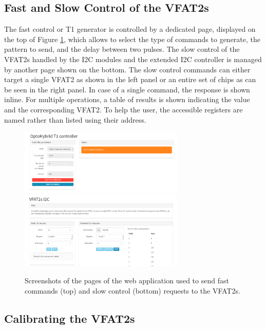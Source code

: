     \subsection{Fast and Slow Control of the VFAT2s}

      The fast control or T1 generator is controlled by a dedicated page, displayed on the top of Figure \ref{fig:II-3-app-control}, which allows to select the type of commands to generate, the pattern to send, and the delay between two pulses. The slow control of the VFAT2s handled by the I2C modules and the extended I2C controller is managed by another page shown on the bottom. The slow control commands can either target a single VFAT2 as shown in the left panel or an entire set of chips as can be seen in the right panel. In case of a single command, the response is shown inline. For multiple operations, a table of results is shown indicating the value and the corresponding VFAT2. To help the user, the accessible registers are named rather than listed using their address.

      \begin{figure}[h!]
        \centering
        \includegraphics[width=0.7\textwidth]{img/II-3-test-beam/app-t1.png} \\
        \includegraphics[width=0.7\textwidth]{img/II-3-test-beam/app-i2c.png}
        \caption{Screenshots of the pages of the web application used to send fast commands (top) and slow control (bottom) requests to the VFAT2s.}
        \label{fig:II-3-app-control}
      \end{figure}

    \subsection{Calibrating the VFAT2s}

